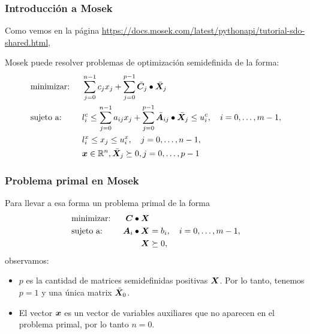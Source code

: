 \documentclass[aspectratio=169,12pt,spanish]{beamer}
\begin{document}

\begin{frame}
\frametitle{Introducción a Mosek}

Como vemos en la página 
{\small 
\url{https://docs.mosek.com/latest/pythonapi/tutorial-sdo-shared.html}, }

Mosek puede resolver problemas de optimización semidefinida de la forma:
\begin{alignat*}{2}
  & \text{minimizar: } & & \sum_{j=0}^{n-1} c_j x_j + \sum_{j=0}^{p-1} \bar {\bm{C}}_j \bullet \bar {\bm{X}}_j \\
  & \text{sujeto a: }  \quad & & l_i^c \le \sum_{j=0}^{n-1} a_{ij} x_j + \sum_{j=0}^{p-1} \bar {\bm{A}}_{ij} \bullet \bar {\bm{X}}_j \le u_i^c, \quad i = 0, \dots, m-1, \\
  &  \quad & & l_i^x \le x_j \le u_i^x, \quad j = 0, \dots, n-1, \\
  & & & \bm{x} \in \mathbb{R}^n, \bar {\bm{X}}_j \succeq 0, j = 0, \dots, p-1
\end{alignat*}

\end{frame}


\begin{frame}

\frametitle{Problema primal en Mosek}

Para llevar a esa forma un problema primal de la forma
\begin{alignat*}{2}
  & \text{minimizar: } & \bm{C} \bullet \bm{X} & \\
  & \text{sujeto a: }  \quad & \bm{A}_i \bullet \bm{X} &= b_i, \quad i = 0, \dots, m-1, \\
   && \bm{X} &\succeq 0,
\end{alignat*}
observamos:
\begin{itemize}
\item $p$ es la cantidad de matrices semidefinidas positivas $\bm{X}$. Por lo tanto, tenemos $p = 1$ y una única matrix $\bar {\bm{X}}_0$.
\item El vector $\bm{x}$ es un vector de variables auxiliares que no aparecen en el problema primal, por lo tanto $n = 0$.
\end{itemize}

\end{frame}

\end{document}
